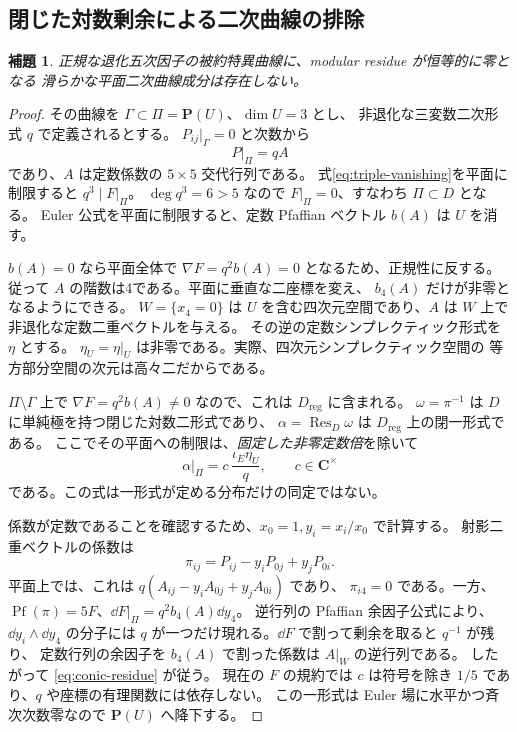 \documentclass[11pt,a4paper]{ltjsarticle}
\newcommand{\CC}{\mathbf C}\newcommand{\QQ}{\mathbf Q}
\newcommand{\PP}{\mathbf P}\renewcommand{\AA}{\mathbf A}
\DeclareMathOperator{\Pf}{Pf}\DeclareMathOperator{\length}{length}
\newtheorem{lemma}[theorem]{補題}
\theoremstyle{remark}\newtheorem{remark}[theorem]{注意}
\begin{document}
\subsection{閉じた対数剰余による二次曲線の排除}

\begin{lemma}\label{lem:conic}
正規な退化五次因子の被約特異曲線に、modular residue が恒等的に零となる
滑らかな平面二次曲線成分は存在しない。
\end{lemma}
\begin{proof}
その曲線を $\Gamma\subset\Pi=\PP(U)$、$\dim U=3$ とし、
非退化な三変数二次形式 $q$ で定義されるとする。
$P_{ij}|_\Gamma=0$ と次数から
\begin{equation}\label{eq:conic-A}
                            P|_\Pi=qA
\end{equation}
であり、$A$ は定数係数の $5\times5$ 交代行列である。
式\eqref{eq:triple-vanishing}を平面に制限すると $q^3\mid F|_\Pi$。
$\deg q^3=6>5$ なので $F|_\Pi=0$、すなわち $\Pi\subset D$ となる。
Euler 公式を平面に制限すると、定数 Pfaffian ベクトル $b(A)$ は $U$ を消す。

$b(A)=0$ なら平面全体で $\nabla F=q^2b(A)=0$ となるため、正規性に反する。
従って $A$ の階数は4である。平面に垂直な二座標を変え、
$b_4(A)$ だけが非零となるようにできる。
$W=\{x_4=0\}$ は $U$ を含む四次元空間であり、$A$ は $W$ 上で非退化な定数二重ベクトルを与える。
その逆の定数シンプレクティック形式を $\eta$ とする。
$\eta_U=\eta|_U$ は非零である。実際、四次元シンプレクティック空間の
等方部分空間の次元は高々二だからである。

$\Pi\setminus\Gamma$ 上で $\nabla F=q^2b(A)\ne0$ なので、これは $D_{\mathrm{reg}}$ に含まれる。
$\omega=\pi^{-1}$ は $D$ に単純極を持つ閉じた対数二形式であり、
$\alpha=\operatorname{Res}_D\omega$ は $D_{\mathrm{reg}}$ 上の閉一形式である。
ここでその平面への制限は、\emph{固定した非零定数倍}を除いて
\begin{equation}\label{eq:conic-residue}
                  \alpha|_\Pi=c\,\frac{\iota_E\eta_U}{q},\qquad c\in\CC^\times
\end{equation}
である。この式は一形式が定める分布だけの同定ではない。

係数が定数であることを確認するため、$x_0=1,y_i=x_i/x_0$ で計算する。
射影二重ベクトルの係数は
\[
                 \pi_{ij}=P_{ij}-y_iP_{0j}+y_jP_{0i}.
\]
平面上では、これは $q(A_{ij}-y_iA_{0j}+y_jA_{0i})$ であり、
$\pi_{i4}=0$ である。一方、$\Pf(\pi)=5F$、$\dd F|_\Pi=q^2b_4(A)\dd y_4$。
逆行列の Pfaffian 余因子公式により、$\dd y_i\wedge\dd y_4$ の分子には
$q$ が一つだけ現れる。$\dd F$ で割って剰余を取ると $q^{-1}$ が残り、
定数行列の余因子を $b_4(A)$ で割った係数は $A|_W$ の逆行列である。
したがって \eqref{eq:conic-residue} が従う。
現在の $F$ の規約では $c$ は符号を除き $1/5$ であり、$q$ や座標の有理関数には依存しない。
この一形式は Euler 場に水平かつ斉次次数零なので $\PP(U)$ へ降下する。


\end{proof}
\end{document}
